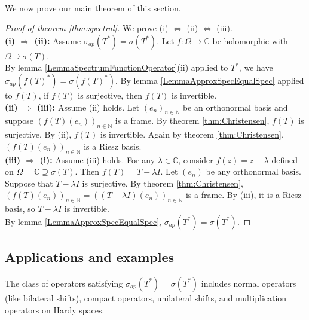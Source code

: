 \documentclass[a4paper,11pt]{article}
\theoremstyle{plain}
\theoremstyle{definition}
\theoremstyle{remark}
\begin{document}
\mbox{} \\
We now prove our main theorem of this section.

\begin{proof}[Proof of theorem \ref{thm:spectral}]
We prove (i) $\Leftrightarrow$ (ii) $\Leftrightarrow$ (iii). \\
\textbf{(i) $\Rightarrow$ (ii):} Assume $\sigma_{ap}(T^*) = \sigma(T^*)$. Let $f: \Omega \to \mathbb{C}$ be holomorphic with $\Omega \supseteq \sigma(T)$. \\
By lemma \ref{LemmaSpectrumFunctionOperator}(ii) applied to $T^*$, we have $\sigma_{ap}(f(T)^*) = \sigma(f(T)^*)$. By lemma \ref{LemmaApproxSpecEqualSpec} applied to $f(T)$, if $f(T)$ is surjective, then $f(T)$ is invertible. \\
\textbf{(ii) $\Rightarrow$ (iii):} Assume (ii) holds. Let $(e_n)_{n \in \mathbb{N}}$ be an orthonormal basis and suppose $(f(T)(e_n))_{n \in \mathbb{N}}$ is a frame. By theorem \ref{thm:Christensen}, $f(T)$ is surjective. By (ii), $f(T)$ is invertible. Again by theorem \ref{thm:Christensen}, $(f(T)(e_n))_{n \in \mathbb{N}}$ is a Riesz basis. \\
\textbf{(iii) $\Rightarrow$ (i):} Assume (iii) holds. For any $\lambda \in \mathbb{C}$, consider $f(z) = z - \lambda$ defined on $\Omega = \mathbb{C} \supseteq \sigma(T)$. Then $f(T) = T - \lambda I$. Let $(e_n)$ be any orthonormal basis. \\
Suppose that $T - \lambda I$ is surjective. By theorem \ref{thm:Christensen}, $(f(T)(e_n))_{n \in \mathbb{N}} = ((T - \lambda I)(e_n))_{n \in \mathbb{N}}$ is a frame. By (iii), it is a Riesz basis, so $T - \lambda I$ is invertible. \\
By lemma \ref{LemmaApproxSpecEqualSpec}, $\sigma_{ap}(T^*) = \sigma(T^*)$.
\end{proof}

\subsection{Applications and examples}
\label{SectionApplications}

The class of operators satisfying $\sigma_{ap}(T^*) = \sigma(T^*)$ includes normal operators \cite{Halmos1961} (like bilateral shifts), compact operators, unilateral shifts, and multiplication operators on Hardy spaces.
\end{document}

